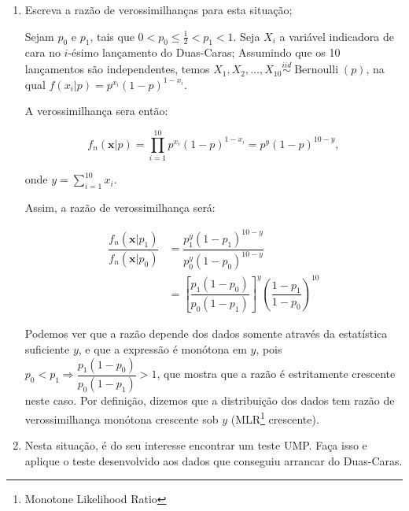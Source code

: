\documentclass[a4paper,10pt, notitlepage]{report}
\newcommand{\pow}{^}%
\newcommand{\bx}{\boldsymbol{x}} %
\newcommand{\op}{\operatorname}
\begin{document}
	\begin{enumerate}
		\item Escreva a razão de verossimilhanças para esta situação;
		
		Sejam $p_0$ e $p_1$, tais que $0<p_0\leq \frac{1}{2}<p_1<1$. Seja $X_i$ a variável indicadora de cara no $i$-ésimo lançamento do Duas-Caras; Assumindo que os 10 lançamentos são independentes, temos $X_1,X_2,\ldots,X_{10}\stackrel{iid}{\sim} \op{Bernoulli}(p)$, na qual $f(x_i|p)=p\pow{x_i}(1-p)\pow{1-x_i}$.
		
		A verossimilhança sera então:
		
		$$f_n(\bx|p)=\prod_{i=1}^{10}p\pow{x_i}(1-p)\pow{1-x_i}=p\pow{y}(1-p)\pow{10-y},$$
		
		onde $\displaystyle y=\sum_{i=1}^{10}x_i$.
		
		Assim, a razão de verossimilhança será:
		
		\begin{align}
			\dfrac{f_n(\bx|p_1)}{f_n(\bx|p_0)}&=\dfrac{p_1\pow{y}(1-p_1)\pow{10-y}}{p_0\pow{y}(1-p_0)\pow{10-y}}\nonumber\\
			&=\left[\dfrac{p_1(1-p_0)}{p_0(1-p_1)}\right]\pow y\left(\dfrac{1-p_1}{1-p_0}\right)\pow{10}\label{lik_ratio}
		\end{align}
		
		Podemos ver que a razão depende dos dados somente através da estatística suficiente $y$, e que a expressão é monótona em $y$, pois $p_0<p_1\Rightarrow \dfrac{p_1(1-p_0)}{p_0(1-p_1)}>1$, que mostra que a razão é estritamente crescente neste caso. Por definição, dizemos que a distribuição dos dados tem razão de verossimilhança monótona crescente sob $y$ (MLR\footnote{Monotone Likelihood Ratio} crescente).
		
		
		\item Nesta situação, é do seu interesse encontrar um teste UMP.
		Faça isso e aplique o teste desenvolvido aos dados que conseguiu arrancar do Duas-Caras.
		

\end{enumerate}
\end{document}
